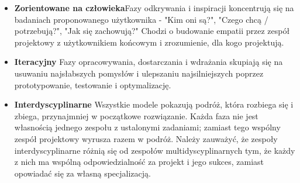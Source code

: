 \documentclass[a4paper,titleauthor]{mwart}
\begin{document}
 \begin{itemize}
	\item \textbf{Zorientowane na człowieka}\newline \newline Fazy odkrywania i inspiracji koncentrują się na badaniach proponowanego użytkownika - "Kim oni są?", "Czego chcą / potrzebują?", "Jak się zachowują?" Chodzi o budowanie empatii przez zespół projektowy z użytkownikiem końcowym i zrozumienie, dla kogo projektują.\newline
	\item \textbf{Iteracyjny} \newline \newline Fazy opracowywania, dostarczania i wdrażania skupiają się na usuwaniu najsłabszych pomysłów i ulepszaniu najsilniejszych poprzez prototypowanie, testowanie i optymalizację.\newline
	\item \textbf{Interdyscyplinarne} \newline \newline Wszystkie modele pokazują podróż, która rozbiega się i zbiega, przynajmniej w początkowe rozwiązanie. Każda faza nie jest własnością jednego zespołu z ustalonymi zadaniami; zamiast tego wspólny zespół projektowy wyrusza razem w podróż. Należy zauważyć, że zespoły interdyscyplinarne różnią się od zespołów multidyscyplinarnych tym, że każdy z nich ma wspólną odpowiedzialność za projekt i jego sukces, zamiast opowiadać się za własną specjalizacją.
 \end{itemize}
\end{document}
